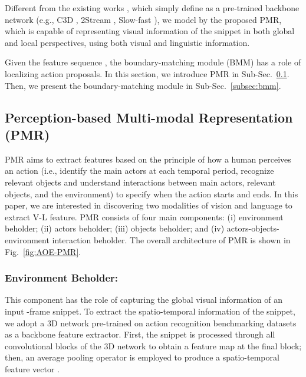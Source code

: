 \documentclass[sn-mathphys]{sn-jnl}
\theoremstyle{thmstyleone}\newtheorem{theorem}{Theorem}\newtheorem{proposition}[theorem]{Proposition}
\theoremstyle{thmstyletwo}\newtheorem{example}{Example}\newtheorem{remark}{Remark}
\theoremstyle{thmstylethree}\newtheorem{definition}{Definition}
\begin{document}
Different from the existing works \cite{BSN++,dbg, gtan_cvpr2019, xu2020gtad, tsi_accv, bmn, lin2018bsn, xu2020gtad, bai2020boundary, tan2021relaxed}, which simply define  as a pre-trained backbone network (e.g., C3D \cite{C3D}, 2Stream \cite{2_stream_1}, Slow-fast \cite{SlowFast}), we model  by the proposed PMR, which is capable of representing visual information of the snippet in both global and local perspectives, using both visual and linguistic information.

Given the feature sequence , the boundary-matching module (BMM) has a role of localizing action proposals.
In this section, we introduce PMR in Sub-Sec.~\ref{subsec:pmr}. Then, we present the boundary-matching module in Sub-Sec.~\ref{subsec:bmm}.

\subsection{Perception-based Multi-modal Representation (PMR)}
\label{subsec:pmr}

PMR aims to extract features based on the principle of how a human perceives an action (i.e., identify the main actors at each temporal period, recognize relevant objects and understand interactions between main actors, relevant objects, and the environment) to specify when the action starts and ends. In this paper, we are interested in discovering two modalities of vision and language to extract V-L feature. PMR consists of four main components: (i) environment beholder; (ii) actors beholder; (iii) objects beholder; and (iv) actors-objects-environment interaction beholder. The overall architecture of PMR is shown in Fig.~\ref{fig:AOE-PMR}.





\subsubsection{Environment Beholder:}
\label{subsubsec:env}
This component has the role of capturing the global visual information of an input -frame snippet. To extract the spatio-temporal information of the snippet, we adopt a 3D network pre-trained on action recognition benchmarking datasets as a backbone feature extractor. First, the snippet is processed through all convolutional blocks of the 3D network to obtain a feature map  at the final block; then, an average pooling operator is employed to produce a spatio-temporal feature vector .
\end{document}
